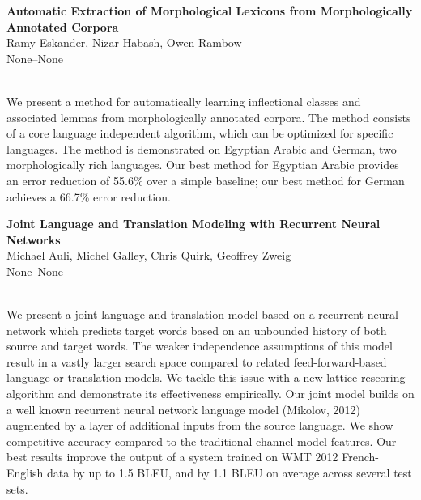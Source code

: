 \documentclass[twoside,makeidx]{book}
\renewcommand{\normalsize}{\fontsize{8}{9}\selectfont}
\renewcommand{\small}{\fontsize{7}{8}\selectfont}
\begin{document}
\par\vspace{2em}\noindent%
\begin{minipage}{\linewidth}%
\begin{center}
\textbf{\normalsize Automatic Extraction of Morphological Lexicons from Morphologically Annotated Corpora}\\
\normalsize  Ramy Eskander,  Nizar Habash,  Owen Rambow\\
{\small None--None}\\
\end{center}
\end{minipage}\\[0.5em]
\nopagebreak%
\noindent%
{\small We present a method for automatically learning inflectional classes and associated lemmas from morphologically annotated corpora. The method consists of a core language independent algorithm, which can be optimized for specific languages. The method is demonstrated on Egyptian Arabic and German, two morphologically rich languages. Our best method for Egyptian Arabic provides an error reduction of 55.6\% over a simple baseline; our best method for German achieves a 66.7\% error reduction.}
\par\vspace{2em}\noindent%
\begin{minipage}{\linewidth}%
\begin{center}
\textbf{\normalsize Joint Language and Translation Modeling with Recurrent Neural Networks}\\
\normalsize  Michael Auli,  Michel Galley,  Chris Quirk,  Geoffrey Zweig\\
{\small None--None}\\
\end{center}
\end{minipage}\\[0.5em]
\nopagebreak%
\noindent%
{\small We present a joint language and translation model based on a recurrent neural network which predicts target words based on an unbounded history of both source and target words. The weaker independence assumptions of this model result in a vastly larger search space compared to related feed-forward-based language or translation models. We tackle this issue with a new lattice rescoring algorithm and demonstrate its effectiveness empirically. Our joint model builds on a well known recurrent neural network language model (Mikolov, 2012) augmented by a layer of additional inputs from the source language. We show competitive accuracy compared to the traditional channel model features. Our best results improve the output of a system trained on WMT 2012 French-English data by up to 1.5 BLEU, and by 1.1 BLEU on average across several test sets.}
\end{document}

